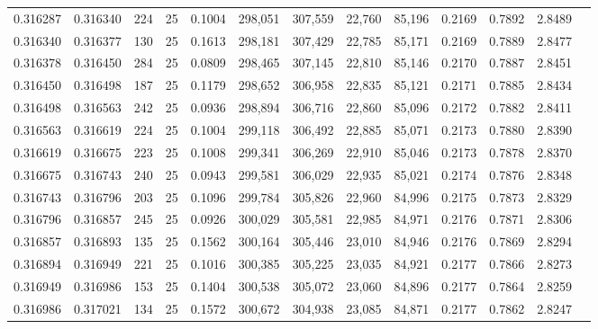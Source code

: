 \begin{tabular}{rrrrrrrrrrrrr}
0.316287 & 0.316340 &   224 &  25 &                                     0.1004 & 298,051 & 307,559 &  22,760 &  85,196 & 0.2169 & 0.7892 & 2.8489 \\
0.316340 & 0.316377 &   130 &  25 &                                     0.1613 & 298,181 & 307,429 &  22,785 &  85,171 & 0.2169 & 0.7889 & 2.8477 \\
0.316378 & 0.316450 &   284 &  25 &                                     0.0809 & 298,465 & 307,145 &  22,810 &  85,146 & 0.2170 & 0.7887 & 2.8451 \\
0.316450 & 0.316498 &   187 &  25 &                                     0.1179 & 298,652 & 306,958 &  22,835 &  85,121 & 0.2171 & 0.7885 & 2.8434 \\
0.316498 & 0.316563 &   242 &  25 &                                     0.0936 & 298,894 & 306,716 &  22,860 &  85,096 & 0.2172 & 0.7882 & 2.8411 \\
0.316563 & 0.316619 &   224 &  25 &                                     0.1004 & 299,118 & 306,492 &  22,885 &  85,071 & 0.2173 & 0.7880 & 2.8390 \\
0.316619 & 0.316675 &   223 &  25 &                                     0.1008 & 299,341 & 306,269 &  22,910 &  85,046 & 0.2173 & 0.7878 & 2.8370 \\
0.316675 & 0.316743 &   240 &  25 &                                     0.0943 & 299,581 & 306,029 &  22,935 &  85,021 & 0.2174 & 0.7876 & 2.8348 \\
0.316743 & 0.316796 &   203 &  25 &                                     0.1096 & 299,784 & 305,826 &  22,960 &  84,996 & 0.2175 & 0.7873 & 2.8329 \\
0.316796 & 0.316857 &   245 &  25 &                                     0.0926 & 300,029 & 305,581 &  22,985 &  84,971 & 0.2176 & 0.7871 & 2.8306 \\
0.316857 & 0.316893 &   135 &  25 &                                     0.1562 & 300,164 & 305,446 &  23,010 &  84,946 & 0.2176 & 0.7869 & 2.8294 \\
0.316894 & 0.316949 &   221 &  25 &                                     0.1016 & 300,385 & 305,225 &  23,035 &  84,921 & 0.2177 & 0.7866 & 2.8273 \\
0.316949 & 0.316986 &   153 &  25 &                                     0.1404 & 300,538 & 305,072 &  23,060 &  84,896 & 0.2177 & 0.7864 & 2.8259 \\
0.316986 & 0.317021 &   134 &  25 &                                     0.1572 & 300,672 & 304,938 &  23,085 &  84,871 & 0.2177 & 0.7862 & 2.8247 \\

\end{tabular}
